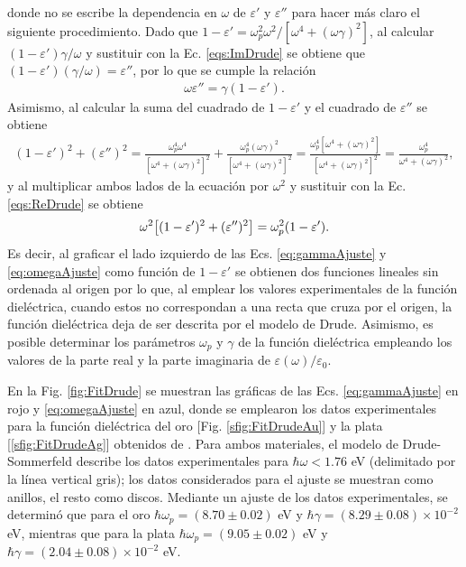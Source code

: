 \noindent		
donde no se escribe la dependencia en $\omega$ de $\varepsilon'$ y $\varepsilon''$ para hacer más claro el siguiente procedimiento. Dado que $1-\varepsilon' = \omega_p^2\omega^2 / [\omega^4 + (\omega\gamma)^2]$, al calcular  $(1-\varepsilon')\gamma/\omega$ y sustituir con la Ec. \eqref{eqs:ImDrude} se obtiene que $	( 1-\varepsilon') (\gamma/\omega)=\varepsilon''$, por lo que se cumple la relación
%
	\begin{align}
	\omega\varepsilon''= \gamma( 1-\varepsilon'). \label{eq:gammaAjuste}
	\end{align}
%
Asimismo, al calcular la suma del cuadrado de $1-\varepsilon'$ y el cuadrado de $\varepsilon''$ se obtiene
%
	\begin{align*}
	( 1-\varepsilon') ^2 + (\varepsilon'')^2 
					=\frac{\omega_p^4 \omega^4}{[\omega^4 + (\omega\gamma)^2]^2}+
									\frac{\omega_p^4 (\omega\gamma)^2}{[\omega^4 + (\omega\gamma)^2]^2}
					= \frac{\omega_p^4[\omega^4 + (\omega\gamma)^2]}{[\omega^4 + (\omega\gamma)^2]^2}
					= \frac{\omega_p^4}{\omega^4 + (\omega\gamma)^2},
		\end{align*}
%
y al multiplicar ambos lados de la ecuación por $\omega^2$	 y sustituir con la Ec. \eqref{eqs:ReDrude} se obtiene
%
	\begin{align}
	\omega^2\qty[( 1-\varepsilon') ^2 + (\varepsilon'')^2 ]  
						= \omega_p^2( 1-\varepsilon').
	\label{eq:omegaAjuste}
	\end{align}
%
Es decir, al graficar el lado izquierdo de las Ecs. \eqref{eq:gammaAjuste} y \eqref{eq:omegaAjuste} como función de $ 1-\varepsilon'$ se obtienen dos funciones lineales sin ordenada al origen por lo que, al emplear los valores experimentales de la función dieléctrica, cuando estos no correspondan a una recta que cruza por el origen, la función dieléctrica deja de ser descrita por el modelo de Drude. Asimismo, es posible determinar los parámetros $\omega_p$ y $\gamma$ de la función dieléctrica empleando los valores de la parte real y la parte imaginaria de $\varepsilon(\omega)/\varepsilon_0$.

En la Fig.  \ref{fig:FitDrude} se muestran las gráficas de las Ecs. \eqref{eq:gammaAjuste} en rojo y \eqref{eq:omegaAjuste} en azul, donde se emplearon los datos experimentales para la función dieléctrica del oro [Fig. \ref{sfig:FitDrudeAu}] y la plata [\ref{sfig:FitDrudeAg}] obtenidos de \cite{johnson1972constants}. Para ambos materiales, el modelo de Drude-Sommerfeld describe los datos experimentales para $\hbar\omega<1.76$ eV (delimitado por la línea vertical gris); los datos considerados para el ajuste se muestran como anillos, el resto como discos. Mediante un ajuste de los datos experimentales, se determinó que para el oro $\hbar\omega_p=(8.70\pm 0.02)$ eV y $\hbar\gamma = (8.29\pm 0.08)\times 10^{-2}$ eV, mientras que para la plata $\hbar\omega_p=(9.05\pm 0.02)$ eV y $\hbar\gamma = (2.04\pm 0.08)\times 10^{-2}$ eV.

